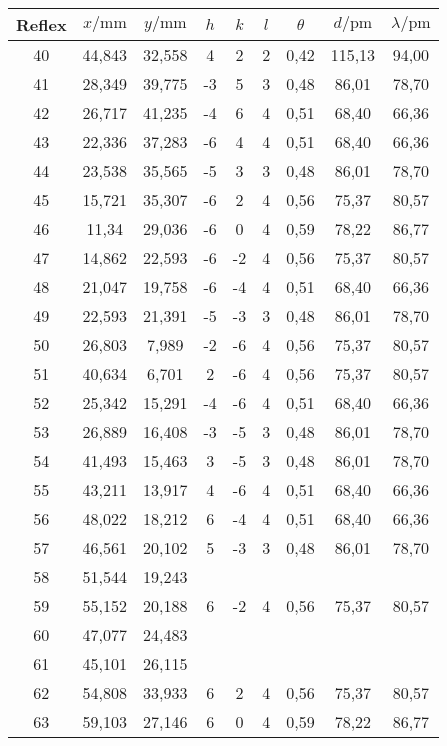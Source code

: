 \begin{table}[h]
\ContinuedFloat
\centering
\begin{tabular}{ccccccccc}
\toprule
Reflex & $x/\si{\milli\meter}$ & $y/\si{\milli\meter}$ & $h$ & $k$ & $l$ & $\theta$ & $d/\si{\pico\meter}$ & $\lambda/\si{\pico\meter}$\\
\midrule
40 & 44,843 & 32,558 & 4 & 2 & 2 & 0,42 & 115,13 & 94,00\\
41 & 28,349 & 39,775 & -3 & 5 & 3 & 0,48 & 86,01 & 78,70\\
42 & 26,717 & 41,235 & -4 & 6 & 4 & 0,51 & 68,40 & 66,36\\
43 & 22,336 & 37,283 & -6 & 4 & 4 & 0,51 & 68,40 & 66,36\\
44 & 23,538 & 35,565 & -5 & 3 & 3 & 0,48 & 86,01 & 78,70\\
45 & 15,721 & 35,307 & -6 & 2 & 4 & 0,56 & 75,37 & 80,57\\
46 & 11,34 & 29,036 & -6 & 0 & 4 & 0,59 & 78,22 & 86,77\\
47 & 14,862 & 22,593 & -6 & -2 & 4 & 0,56 & 75,37 & 80,57\\
48 & 21,047 & 19,758 & -6 & -4 & 4 & 0,51 & 68,40 & 66,36\\
49 & 22,593 & 21,391 & -5 & -3 & 3 & 0,48 & 86,01 & 78,70\\
50 & 26,803 & 7,989 & -2 & -6 & 4 & 0,56 & 75,37 & 80,57\\
51 & 40,634 & 6,701 & 2 & -6 & 4 & 0,56 & 75,37 & 80,57\\
52 & 25,342 & 15,291 & -4 & -6 & 4 & 0,51 & 68,40 & 66,36\\
53 & 26,889 & 16,408 & -3 & -5 & 3 & 0,48 & 86,01 & 78,70\\
54 & 41,493 & 15,463 & 3 & -5 & 3 & 0,48 & 86,01 & 78,70\\
55 & 43,211 & 13,917 & 4 & -6 & 4 & 0,51 & 68,40 & 66,36\\
56 & 48,022 & 18,212 & 6 & -4 & 4 & 0,51 & 68,40 & 66,36\\
57 & 46,561 & 20,102 & 5 & -3 & 3 & 0,48 & 86,01 & 78,70\\
58 & 51,544 & 19,243 &  &  &  &  &  & \\
59 & 55,152 & 20,188 & 6 & -2 & 4 & 0,56 & 75,37 & 80,57\\
60 & 47,077 & 24,483 &  &  &  &  &  & \\
61 & 45,101 & 26,115 &  &  &  &  &  & \\
62 & 54,808 & 33,933 & 6 & 2 & 4 & 0,56 & 75,37 & 80,57\\
63 & 59,103 & 27,146 & 6 & 0 & 4 & 0,59 & 78,22 & 86,77\\

\end{tabular}
\end{table}

